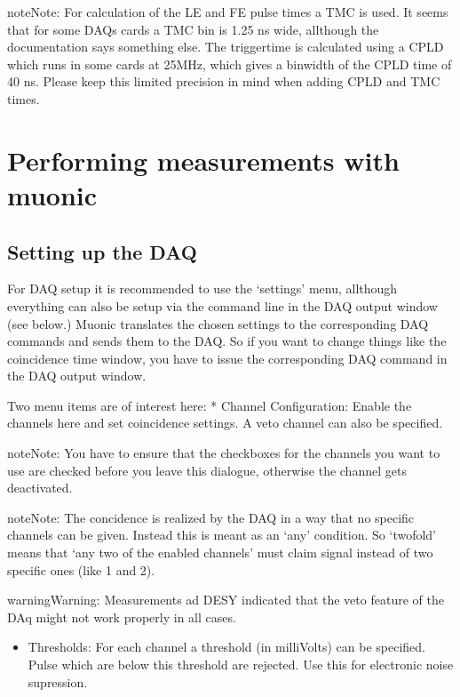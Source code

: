 \documentclass[letterpaper,10pt,english]{sphinxmanual}
\begin{document}
\begin{notice}{note}{Note:}
For calculation of the LE and FE pulse times a TMC is used. It seems that for some DAQs cards a TMC bin is 1.25 ns wide, allthough the documentation says something else.
The triggertime is calculated using a CPLD which runs in some cards at 25MHz, which gives a binwidth of the CPLD time of 40 ns.
Please keep this limited precision in mind when adding CPLD and TMC times.
\end{notice}


\section{Performing measurements with muonic}
\label{tutorial:performing-measurements-with-muonic}

\subsection{Setting up the DAQ}
\label{tutorial:setting-up-the-daq}
For DAQ setup it is recommended to use the `settings' menu, allthough everything can also be setup via the command line in the DAQ output window (see below.)
Muonic translates the chosen settings to the corresponding DAQ commands and sends them to the DAQ. So if you want to change things like the coincidence time window, you have to issue the corresponding DAQ command in the DAQ output window.

Two menu items are of interest here:
* Channel Configuration: Enable the channels here and set coincidence settings. A veto channel can also be specified.

\begin{notice}{note}{Note:}
You have to ensure that the checkboxes for the channels you want to use are checked before you leave this dialogue, otherwise the channel gets deactivated.
\end{notice}

\begin{notice}{note}{Note:}
The concidence is realized by the DAQ in a way that no specific channels can be given. Instead this is meant as an `any' condition.
So `twofold' means that `any two of the enabled channels' must claim signal instead of two specific ones (like 1 and 2).
\end{notice}

\begin{notice}{warning}{Warning:}
Measurements ad DESY indicated that the veto feature of the DAq might not work properly in all cases.
\end{notice}
\begin{itemize}
\item {} 
Thresholds: For each channel a threshold (in milliVolts) can be specified. Pulse which are below this threshold are rejected. Use this for electronic noise supression.

\end{itemize}
\end{document}

